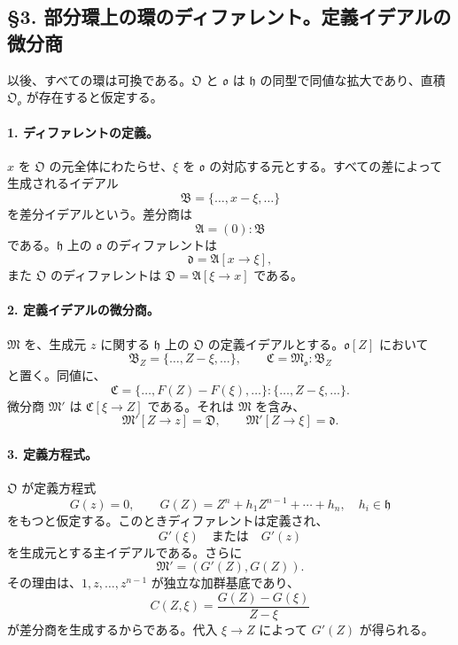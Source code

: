 \subsection*{§3. 部分環上の環のディファレント。定義イデアルの微分商}

以後、すべての環は可換である。\(\mathfrak O\) と \(\mathfrak o\) は \(\mathfrak h\) の同型で同値な拡大であり、直積 \(\mathfrak O_{\mathfrak o}\) が存在すると仮定する。

\paragraph{1. ディファレントの定義。}
\(x\) を \(\mathfrak O\) の元全体にわたらせ、\(\xi\) を \(\mathfrak o\) の対応する元とする。すべての差によって生成されるイデアル
\[
        \mathfrak B=\{\ldots,x-\xi,\ldots\}
\]
を差分イデアルという。差分商は
\[
        \mathfrak A=(0):\mathfrak B
\]
である。\(\mathfrak h\) 上の \(\mathfrak o\) のディファレントは
\[
        \mathfrak d=\mathfrak A[x\to\xi],
\]
また \(\mathfrak O\) のディファレントは \(\mathfrak D=\mathfrak A[\xi\to x]\) である。

\paragraph{2. 定義イデアルの微分商。}
\(\mathfrak M\) を、生成元 \(z\) に関する \(\mathfrak h\) 上の \(\mathfrak O\) の定義イデアルとする。\(\mathfrak o[Z]\) において
\[
        \mathfrak B_Z=\{\ldots,Z-\xi,\ldots\},
        \qquad
        \mathfrak C=\mathfrak M_{\mathfrak o}:\mathfrak B_Z
\]
と置く。同値に、
\[
        \mathfrak C=\{\ldots,F(Z)-F(\xi),\ldots\}:\{\ldots,Z-\xi,\ldots\}.
\]
微分商 \(\mathfrak M'\) は \(\mathfrak C[\xi\to Z]\) である。それは \(\mathfrak M\) を含み、
\[
        \mathfrak M'[Z\to z]=\mathfrak D,
        \qquad
        \mathfrak M'[Z\to\xi]=\mathfrak d.
\]

\paragraph{3. 定義方程式。}
\(\mathfrak O\) が定義方程式
\[
        G(z)=0,
        \qquad
        G(Z)=Z^n+h_1Z^{n-1}+\cdots+h_n,
        \quad h_i\in\mathfrak h
\]
をもつと仮定する。このときディファレントは定義され、
\[
        G'(\xi) \quad\text{または}\quad G'(z)
\]
を生成元とする主イデアルである。さらに
\[
        \mathfrak M'=(G'(Z),G(Z)).
\]
その理由は、\(1,z,\ldots,z^{n-1}\) が独立な加群基底であり、
\[
        C(Z,\xi)=\frac{G(Z)-G(\xi)}{Z-\xi}
\]
が差分商を生成するからである。代入 \(\xi\to Z\) によって \(G'(Z)\) が得られる。

